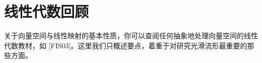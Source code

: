 \documentclass[../main.tex]{subfiles}
\begin{document}
\chapter{线性代数回顾}\label{chapter:appB-linear-algebra-review}

关于向量空间与线性映射的基本性质，你可以查阅任何抽象地处理向量空间的线性代数教材，如 [FIS03]。这里我们只概述要点，着重于对研究光滑流形最重要的那些方面。






\end{document}
